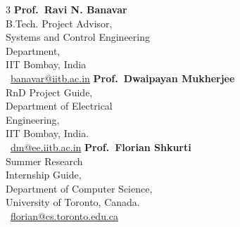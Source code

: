 \documentclass[10pt,letterpaper,sans]{moderncv}        %
\begin{document}
\vspace{-10 pt}
\setlength{\columnsep}{0.8cm}
\begin{multicols}{3}
\centering
\textbf{Prof.\ Ravi N. Banavar}\\
    B.Tech. Project Advisor,\\
    Systems and Control Engineering \\ Department, \\
    IIT Bombay, India\\
    {\color{blue}{\footnotesize{\faEnvelope}}}\ \href{mailto:banavar@iitb.ac.in}{banavar@iitb.ac.in}
\vfill\columnbreak
\centering
    \textbf{Prof.\ Dwaipayan Mukherjee}\\
    RnD Project Guide,\\
    Department of Electrical\\ Engineering,\\
    IIT Bombay, India.\\
    {\color{blue}{\footnotesize{\faEnvelope}}}\ \href{mailto:dm@ee.iitb.ac.in}{dm@ee.iitb.ac.in}
    \vfill\columnbreak
\centering
    \textbf{Prof.\ Florian Shkurti}\\
    Summer Research\\ Internship Guide,\\
    Department of Computer Science,\\
    University of Toronto, Canada. \\
    {\color{blue}{\footnotesize{\faEnvelope}}}\ \href{mailto:florian@cs.toronto.edu}{florian@cs.toronto.edu.ca}

\end{multicols}

\end{document}
